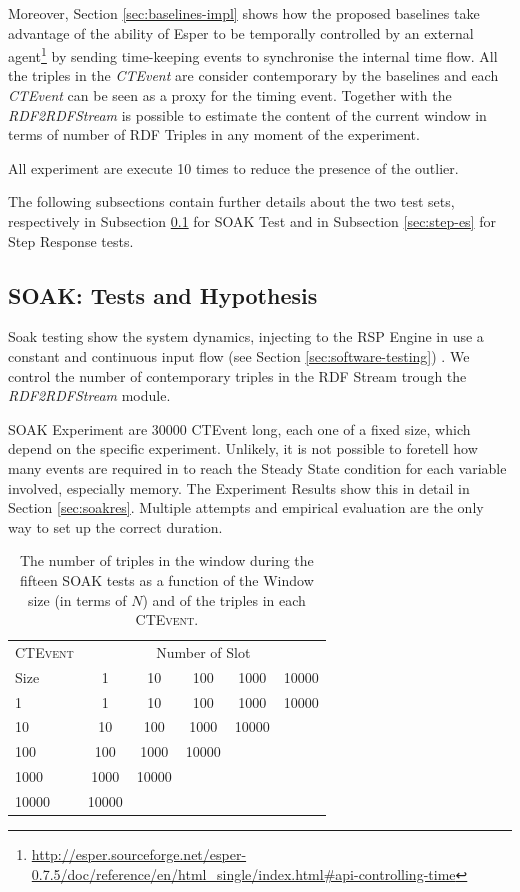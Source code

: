 Moreover, Section \ref{sec:baselines-impl} shows how the proposed baselines take advantage of the ability of Esper to be temporally controlled by an external agent\footnote{\url{http://esper.sourceforge.net/esper-0.7.5/doc/reference/en/html_single/index.html#api-controlling-time}} by sending time-keeping events to synchronise the internal time flow. All the triples in the \textit{CTEvent} are consider contemporary by the baselines and each \textit{CTEvent} can be seen as a proxy for the timing event. Together with the \textit{RDF2RDFStream} is possible to estimate the content of the current window in terms of number of RDF Triples in any moment of the experiment.

All experiment are execute 10 times to reduce the presence of the outlier.

The following subsections contain further details about the two test sets, respectively in Subsection \ref{sec:soak-es} for SOAK Test and in Subsection \ref{sec:step-es} for Step Response tests.

\subsection{SOAK: Tests and Hypothesis}\label{sec:soak-es}

Soak testing show the system dynamics, injecting to the RSP Engine in use a constant and continuous input flow (see Section \ref{sec:software-testing}) . We control the number of contemporary triples in the RDF Stream trough the \textit{RDF2RDFStream} module. %

SOAK Experiment are 30000 CTEvent long, each one of a fixed size, which depend on the specific experiment. Unlikely, it is not possible to foretell how many events are required in to reach the Steady State condition for each variable involved, especially memory. The Experiment Results show this in detail in Section \ref{sec:soakres}. Multiple attempts and empirical evaluation are the only way to set up the correct duration.

\begin{table}[htb]
\centering
\normalsize
 \begin{tabular}{l| ccccc}
	  	\hline
		\textsc{CTEvent}  &\multicolumn{5}{c}{Number of Slot}  \\
		Size  & 1 & 10 & 100 & 1000&10000 \\
		\hline	
		1 & 1& 10 & 100 & 1000&10000 \\
		10  & 10 & 100 & 1000&10000 \\
		100 & 100&1000&10000  \\
		1000 &1000 & 10000 \\
		10000&10000  \\
		\hline 
	\end{tabular}
	
	 \vspace{10pt}
	\caption{The number of triples in the window during the fifteen SOAK tests as a function of the Window size (in terms of $N$) and of the triples in each \textsc{CTEvent}.}
	\label{tab:soaktests}
\end{table}

